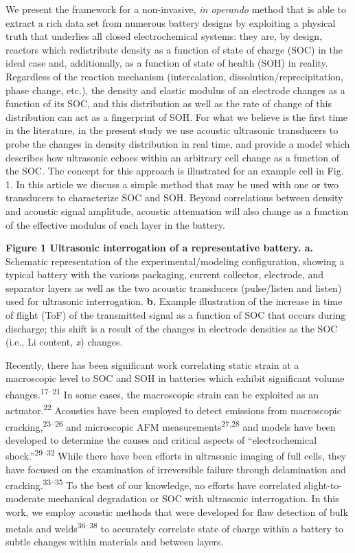 \documentclass[]{article}
\begin{document}
{ }We present the framework for a non-invasive, \emph{in operando}
method that is able to extract a rich data set from numerous battery
designs by exploiting a physical truth that underlies all closed
electrochemical systems: they are, by design, reactors which
redistribute density as a function of state of charge (SOC) in the ideal
case and, additionally, as a function of state of health (SOH) in
reality. Regardless of the reaction mechanism (intercalation,
dissolution/reprecipitation, phase change, etc.), the density and
elastic modulus of an electrode changes as a function of its SOC, and
this distribution as well as the rate of change of this distribution can
act as a fingerprint of SOH. For what we believe is the first time in
the literature, in the present study we use acoustic ultrasonic
transducers to probe the changes in density distribution in real time,
and provide a model which describes how ultrasonic echoes within an
arbitrary cell change as a function of the SOC. The concept for this
approach is illustrated for an example cell in Fig. 1. In this article
we discuss a simple method that may be used with one or two transducers
to characterize SOC and SOH. Beyond correlations between density and
acoustic signal amplitude, acoustic attenuation will also change as a
function of the effective modulus of each layer in the battery.

\textbf{Figure 1 \textbar{} Ultrasonic interrogation of a representative
battery. a.} Schematic representation of the experimental/modeling
configuration, showing a typical battery with the various packaging,
current collector, electrode, and separator layers as well as the two
acoustic transducers (pulse/listen and listen) used for ultrasonic
interrogation. \textbf{b.} Example illustration of the increase in time
of flight (ToF) of the transmitted signal as a function of SOC that
occurs during discharge; this shift is a result of the changes in
electrode densities as the SOC (i.e., Li content, \emph{x}) changes.

{ }Recently, there has been significant work correlating static strain
at a macroscopic level to SOC and SOH in batteries which exhibit
significant volume changes.\textsuperscript{17--21} In some cases, the
macroscopic strain can be exploited as an actuator.\textsuperscript{22}
Acoustics have been employed to detect emissions from macroscopic
cracking,\textsuperscript{23--26} and microscopic AFM
measurements\textsuperscript{27,28} \textsubscript{} and models have
been developed to determine the causes and critical aspects of
``electrochemical shock.''\textsuperscript{29--32} While there have been
efforts in ultrasonic imaging of full cells, they have focused on the
examination of irreversible failure through delamination and
cracking.\textsuperscript{33--35} To the best of our knowledge, no
efforts have correlated slight-to-moderate mechanical degradation or SOC
with ultrasonic interrogation. In this work, we employ acoustic methods
that were developed for flaw detection of bulk metals and
welds\textsuperscript{36--38} to accurately correlate state of charge
within a battery to subtle changes within materials and between layers.
\end{document}
